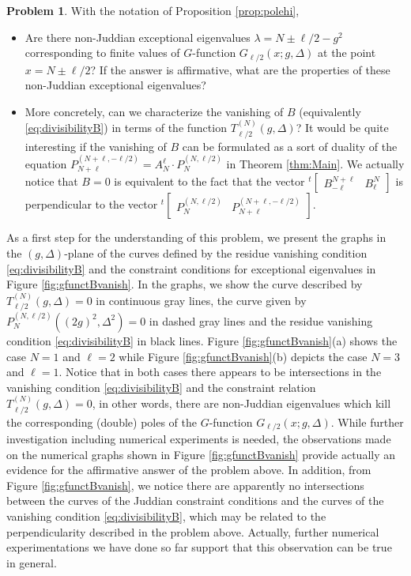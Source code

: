 \documentclass[11pt]{article}
\numberwithin{equation}{section}
\newcommand{\cp}[2]{P^{(#1)}_{#2}} %
\theoremstyle{plain}
\theoremstyle{definition}
\newtheorem{prob}{Problem}[section]
\theoremstyle{remark}
\begin{document}
\begin{prob} \label{pr:non-Juddian}
  With the notation of Proposition \ref{prop:polehi},
  \begin{itemize}
  \item  Are there non-Juddian exceptional eigenvalues \(\lambda = N \pm \ell/2 -g^2\) corresponding to finite values of
    $G$-function $G_{\ell/2}(x;g,\Delta)$ at the point \(x = N \pm \ell/2 \)? If the answer is affirmative, what are the
    properties of these non-Juddian exceptional eigenvalues?
  \item More concretely, can we characterize the vanishing of $B$ (equivalently \eqref{eq:divisibilityB})
    in terms of the function $T^{(N)}_{\ell/2}(g,\Delta)$?
    It would be quite interesting if the vanishing of $B$ can be formulated
    as a sort of duality of the equation
    $P_{N+\ell}^{(N+\ell, -\ell/2)}= A_N^\ell\cdot P_N^{(N,\ell/2)}$ in Theorem \ref{thm:Main}.
    We actually notice that $B=0$ is equivalent to the fact that the vector
    ${}^{t\!}\begin{bmatrix}B_{-\ell}^{N+\ell} & B_\ell^N\end{bmatrix}$
    is perpendicular to the vector
    ${}^{t\!}\begin{bmatrix}P_{N}^{(N, \ell/2)} & P_{N+\ell}^{(N+\ell, -\ell/2)}\end{bmatrix}$.
  \end{itemize}
\end{prob}

As a first step for the understanding of this problem, we present the graphs in the \((g,\Delta)\)-plane of the curves defined by the residue
vanishing condition \eqref{eq:divisibilityB} and the constraint conditions for exceptional eigenvalues in Figure \ref{fig:gfunctBvanish}.
In the graphs, we show the curve described by \( T^{(N)}_{\ell/2}(g,\Delta) = 0\) in continuous gray lines, the curve given by
\( \cp{N,\ell/2}{N}((2g)^2,\Delta^2)= 0 \) in dashed gray lines and the residue vanishing condition \eqref{eq:divisibilityB} in black lines. Figure
\ref{fig:gfunctBvanish}(a) shows the case $N=1$ and \(\ell=2 \) while Figure \ref{fig:gfunctBvanish}(b) depicts the case $N=3$ and $\ell = 1$.
Notice that in both cases there appears to be intersections in the vanishing condition \eqref{eq:divisibilityB} and the constraint relation
\( T^{(N)}_{\ell/2}(g,\Delta) = 0\), in other words, there are non-Juddian eigenvalues which kill the corresponding (double) poles of the $G$-function
$G_{\ell/2}(x;g,\Delta)$. While further investigation including numerical experiments is needed, the observations made on the numerical graphs
shown in Figure \ref{fig:gfunctBvanish} provide actually an evidence for the affirmative answer of the problem above. In addition, from Figure \ref{fig:gfunctBvanish},
we notice there are apparently no intersections between the curves of the Juddian constraint conditions and the curves of the vanishing condition
\eqref{eq:divisibilityB}, which may be related to the perpendicularity described in the problem above. Actually, further numerical experimentations
we have done so far support that this observation can be true in general.
\end{document}
